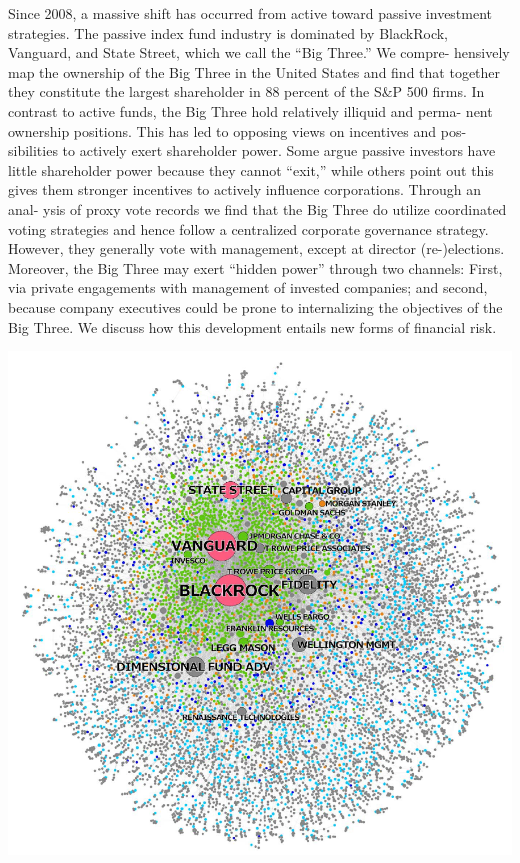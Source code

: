 \documentclass[
]{book}
\begin{document}
Since 2008, a massive shift has occurred from active toward passive
investment strategies. The passive index fund industry is dominated by
BlackRock, Vanguard, and State Street, which we call the ``Big Three.'' We compre-
hensively map the ownership of the Big Three in the United States and find that
together they constitute the largest shareholder in 88 percent of the S\&P 500
firms. In contrast to active funds, the Big Three hold relatively illiquid and perma-
nent ownership positions. This has led to opposing views on incentives and pos-
sibilities to actively exert shareholder power. Some argue passive investors have
little shareholder power because they cannot ``exit,'' while others point out this
gives them stronger incentives to actively influence corporations. Through an anal-
ysis of proxy vote records we find that the Big Three do utilize coordinated voting
strategies and hence follow a centralized corporate governance strategy. However,
they generally vote with management, except at director (re-)elections. Moreover,
the Big Three may exert ``hidden power'' through two channels: First, via private
engagements with management of invested companies; and second, because
company executives could be prone to internalizing the objectives of the Big
Three. We discuss how this development entails new forms of financial risk.

\includegraphics{fig/Fichtner_Hidden_Power_of_Big_Tree.png}
\end{document}
